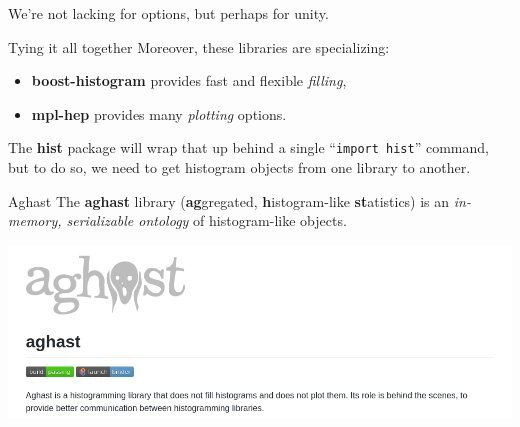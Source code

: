 \documentclass[aspectratio=169]{beamer}
\begin{document}
\begin{frame}{}
\vspace{1 cm}
\Large
\begin{center}
We're not lacking for options, but perhaps for unity.
\end{center}
\end{frame}

\begin{frame}{Tying it all together}
\large
\vspace{0.5 cm}
Moreover, these libraries are specializing:

\vspace{0.25 cm}
\begin{itemize}
\item {\bf boost-histogram} provides fast and flexible {\it filling},
\item {\bf mpl-hep} provides many {\it plotting} options.
\end{itemize}

\vspace{0.25 cm}
The {\bf hist} package will wrap that up behind a single ``\texttt{import hist}'' command, but to do so, we need to get histogram objects from one library to another.
\end{frame}

\begin{frame}{Aghast}
\large
\vspace{0.5 cm}
The {\bf aghast} library ({\bf ag}gregated, {\bf h}istogram-like {\bf st}atistics) is an {\it in-memory, serializable ontology} of histogram-like objects.

\vspace{0.75 cm}
\includegraphics[width=\linewidth]{aghast-github.png}
\end{frame}
\end{document}
